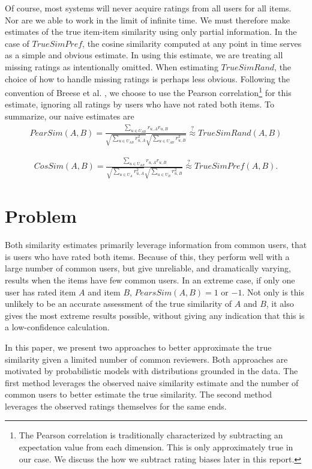 \documentclass[11pt]{article}
\begin{document}
Of course, most systems will never acquire ratings from all users for all items.
Nor are we able to work in the limit of infinite time. We must therefore make
estimates of the true item-item similarity using only partial information. In
the case of $TrueSimPref$, the cosine similarity computed at any point in time
serves as a simple and obvious estimate. In using this estimate, we are treating
all missing ratings as intentionally omitted. When estimating $TrueSimRand$, the
choice of how to handle missing ratings is perhaps less obvious. Following the
convention of Breese et al. \cite{Breese1998}, we choose to use the Pearson
correlation\footnote{The Pearson correlation is traditionally characterized by
subtracting an expectation value from each dimension. This is only approximately
true in our case. We discuss the how we subtract rating biases later in this
report.} for this estimate, ignoring all ratings by users who have not rated
both items. To summarize, our naive estimates are
\begin{align}
PearSim(A, B) = \frac{\sum\limits_{u\in U_{AB}}
r_{u,A}r_{u,B}}{\sqrt{\sum\limits_{u\in U_{AB}} r_{u,A}^2}
\sqrt{\sum\limits_{u\in U_{AB}} r_{u,B}^2}}
\stackrel{?}{\approx} TrueSimRand(A, B)
\end{align}

\begin{align}
CosSim(A, B) = \frac{\sum\limits_{u\in U_{AB}}
r_{u,A}r_{u,B}}{\sqrt{\sum\limits_{u\in U_A} r_{u,A}^2}
\sqrt{\sum\limits_{u\in U_B} r_{u,B}^2}}
\stackrel{?}{\approx} TrueSimPref(A, B).
\end{align}

\section*{Problem}
Both similarity estimates primarily leverage information from common users, that
is users who have rated both items. Because of this, they perform well with a
large number of common users, but give unreliable, and dramatically varying,
results when the items have few common users. In an extreme case, if only one
user has rated item $A$ and item $B$, $PearsSim(A, B) = 1$ or $-1$. Not only is
this unlikely to be an accurate assessment of the true similarity of $A$ and
$B$, it also gives the most extreme results possible, without giving any
indication that this is a low-confidence calculation.

In this paper, we present two approaches to better approximate the
true similarity given a limited number of common reviewers. Both approaches are
motivated by probabilistic models with distributions grounded in the data. The
first method leverages the observed naive similarity estimate and the number of
common users to better estimate the true similarity. The second method leverages
the observed ratings themselves for the same ends.
\end{document}
